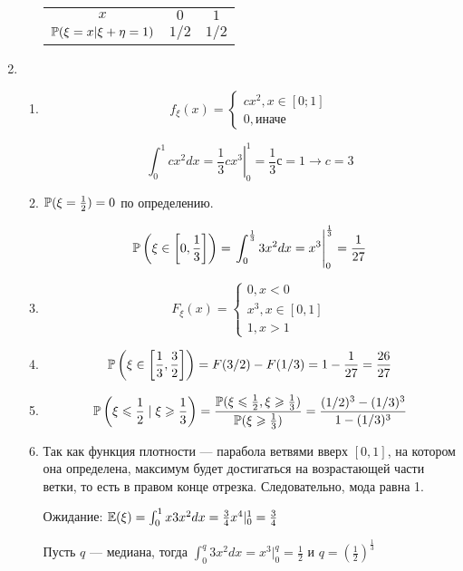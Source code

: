 \begin{enumerate}
\begin{enumerate}
\begin{center}
\begin{tabular}{ccc}
\toprule
$x$ & $0$ & $1$ \\
$\P(\xi = x | \xi + \eta = 1)$ & $1/2$ & $1/2$ \\ 
\bottomrule
\end{tabular}
\end{center}
\end{enumerate}

\item
\begin{enumerate}
\item
\[
f_\xi(x) =
\begin{cases}
cx^2 , x \in [0;1] \\
0 , \text{иначе}
\end{cases}
\]

\[
\int_{0}^{1}cx^2 dx= \left. \frac{1}{3}c x^3 \right|_0^1 = \frac{1}{3} с = 1 \to c = 3
\]

\item
$\P(\xi = \frac{1}{2}) = 0$ по определению.

\[
\P\left(\xi \in \left[0, \frac{1}{3}\right]\right) = \left. \int_{0}^{\frac{1}{3}} 3x^2 dx = x^3 \right|_0^{\frac{1}{3}}  = \frac{1}{27}
\]
\item
\[
F_\xi(x) =
\begin{cases}
0, x < 0\\
x^3, x \in [0, 1]\\
1, x > 1
\end{cases}
\]

\item
\[
  \P\left(\xi \in \left[\frac{1}{3}, \frac{3}{2}\right]\right) = F(3/2) - F(1/3) = 1 - \frac{1}{27} = \frac{26}{27}
\]
\item
\[
	\P\left(\xi \le \frac{1}{2} \mid  \xi \ge \frac{1}{3}\right) = \frac{\P(\xi \le \frac{1}{2} ,  \xi \ge \frac{1}{3})}{\P(\xi \ge \frac{1}{3})} = \frac{(1/2)^3 - (1/3)^3}{1 - (1/3)^3}
\]


\item
Так как функция плотности — парабола ветвями вверх $[0, 1]$, на котором она определена,
максимум будет достигаться на возрастающей части ветки, то есть в правом конце отрезка.
Следовательно, мода равна 1.


Ожидание:
$\E(\xi) = \int_{0}^{1} x 3x^2 dx = \frac{3}{4} x^4 |_0^1 = \frac{3}{4}$

Пусть $q$ — медиана, тогда
$\int_{0}^q 3 x^2 dx = x^3  |_0^q = \frac{1}{2}$ и $q = \left(\frac{1}{2}\right)^\frac{1}{3}$
\end{enumerate}


\end{enumerate}
